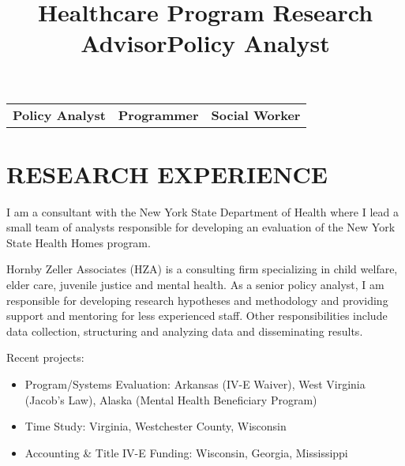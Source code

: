 \documentclass[line, margin, 10pt]{res}
\begin{document}
 

\address{156 Willow Street Guilderland, NY 12084}
\address{andy.choens@gmail.com  (518) 275-5984}

\begin{resume}

  \vspace{.01in}
  \begin{tabular} {c|c|c}
    {\bf Policy Analyst} & {\bf Programmer} & {\bf Social Worker}
  \end{tabular}
  \vspace{.01in}

  \section{RESEARCH EXPERIENCE}


  \title{Healthcare Program Research Advisor}
  \begin{position}
    I am a consultant with the New York State Department of Health
    where I lead a small team of analysts responsible for developing
    an evaluation of the New York State Health Homes program.
  \end{position}

  \title{Policy Analyst}
  \begin{position}
    Hornby Zeller Associates (HZA) is a consulting firm specializing
    in child welfare, elder care, juvenile justice and mental
    health. As a senior policy analyst, I am responsible for
    developing research hypotheses and methodology and providing
    support and mentoring for less experienced staff. Other
    responsibilities include data collection, structuring and
    analyzing data and disseminating results.

    Recent projects:
    \begin{itemize}
    \item Program/Systems Evaluation: Arkansas (IV-E Waiver), West
      Virginia (Jacob's Law), Alaska (Mental Health Beneficiary Program)
    \item Time Study: Virginia, Westchester County, Wisconsin
    \item Accounting \& Title IV-E Funding: Wisconsin, Georgia, Mississippi
    \end{itemize}


\end{position}
\end{resume}
\end{document}
